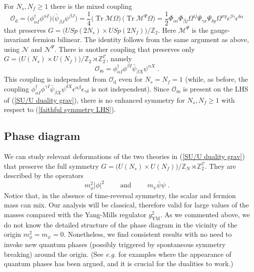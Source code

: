 \documentclass[a4paper, 12pt]{article}
\newcommand{\eg}{\textit{e.g.}}
\numberwithin{equation}{section}
\newcommand{\be}{\begin{equation}} \newcommand{\ee}{\end{equation}}
\newcommand{\cC}{\mathcal{C}}
\newcommand{\cM}{\mathcal{M}}
\newcommand{\cN}{\mathcal{N}}
\newcommand{\cO}{\mathcal{O}}
\newcommand{\bZ}{\mathbb{Z}}
\DeclareMathOperator{\Tr}{Tr}
\begin{document}
For $N_s,N_f\geq 1$ there is the mixed coupling
\be
\cO_\text{d} = \big(\phi^\dag_{\alpha I}  \phi^{\alpha I} \big)\big( \bar\psi_{\beta J} \psi^{\beta J} \big) = \frac14 \big( \Tr \cM\Omega\big) \, \big( \Tr \cM^\Psi \Omega \big) = \frac12 \Phi_{\alpha i} \Phi_{\beta j} \Omega^{ij} \Psi_{\gamma x} \Psi_{\delta y} \Omega^{xy} \epsilon^{\beta\gamma} \epsilon^{\delta\alpha}
\ee
that preserves $G = \big( USp(2N_s) \times USp(2N_f) \big)/\bZ_2$. Here $\cM^\Psi$ is the gauge-invariant fermion bilinear. The identity follows from the same argument as above, using $\cN$ and $\cN^\Psi$. There is another coupling that preserves only $G = \big( U(N_s) \times U(N_f) \big)/\bZ_2 \rtimes \bZ_2^\cC$, namely
\be
\cO_\text{m} = \phi^\dag_{\alpha I} \phi^{\beta I} \bar\psi_{\beta X} \psi^{\alpha X} \;.
\ee
This coupling is independent from $\cO_\text{d}$ even for $N_s = N_f = 1$ (while, as before, the coupling $\phi^\dag_{\alpha I} \phi^{\gamma I} \bar\psi_{\beta X} \psi^{\delta X} \epsilon^{\alpha\beta} \epsilon_{\gamma\delta}$ is not independent). Since $\cO_\text{m}$ is present on the LHS of (\ref{SU/U duality grav}), there is no enhanced symmetry for $N_s, N_f\geq 1$ with respect to (\ref{faithful symmetry LHS}).







\subsection{Phase diagram}

We can study relevant deformations of the two theories in (\ref{SU/U duality grav}) that preserve the full symmetry $G = \big( U(N_s) \times U(N_f) \big)/\bZ_N \rtimes \bZ_2^\cC$. They are described by the operators
\be
\label{mass deformations}
m_\phi^2 |\phi|^2 \qquad\text{ and }\qquad m_\psi \bar\psi\psi \;.
\ee
Notice that, in the absence of time-reversal symmetry, the scalar and fermion mass can mix. Our analysis will be classical, therefore valid for large values of the masses compared with the Yang-Mills regulator $g_\text{YM}^2$. As we commented above, we do not know the detailed structure of the phase diagram in the vicinity of the origin $m_\phi^2 = m_\psi = 0$. Nonetheless, we find consistent results with no need to invoke new quantum phases (possibly triggered by spontaneous symmetry breaking) around the origin. (See \eg{} \cite{Komargodski:2017keh, Gomis:2017ixy} for examples where the appearance of quantum phases has been argued, and it is crucial for the dualities to work.)
\end{document}
